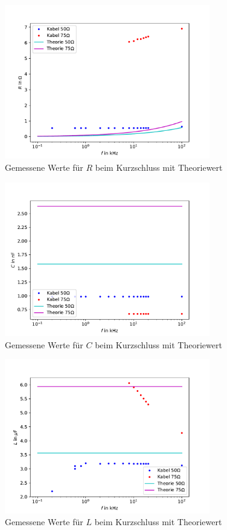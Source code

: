 

\begin{figure}[h]
	\centering
	\includegraphics[width=0.8\textwidth]{RLC_DirekteMessung/build/PlotR.pdf}
	\caption{Gemessene Werte für $R$ beim Kurzschluss mit Theoriewert}
	\label{fig:PlotR}
\end{figure}
\begin{figure}[h]
	\centering
	\includegraphics[width=0.8\textwidth]{RLC_DirekteMessung/build/PlotC.pdf}
	\caption{Gemessene Werte für $C$ beim Kurzschluss mit Theoriewert}
	\label{fig:PlotC}
\end{figure}
\begin{figure}[h]
	\centering
	\includegraphics[width=0.8\textwidth]{RLC_DirekteMessung/build/PlotL.pdf}
	\caption{Gemessene Werte für $L$ beim Kurzschluss mit Theoriewert}
	\label{fig:PlotL}
\end{figure}
